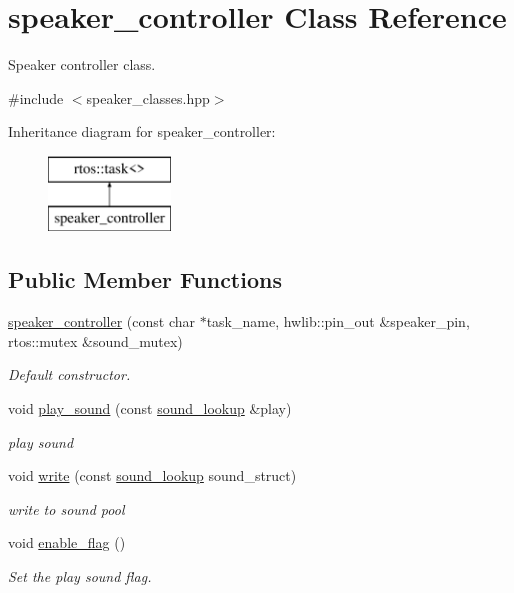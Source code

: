 \hypertarget{classspeaker__controller}{}\section{speaker\+\_\+controller Class Reference}
\label{classspeaker__controller}


Speaker controller class.  




{\ttfamily \#include $<$speaker\+\_\+classes.\+hpp$>$}

Inheritance diagram for speaker\+\_\+controller\+:\begin{figure}[H]
\begin{center}
\leavevmode
\includegraphics[height=2.000000cm]{classspeaker__controller}
\end{center}
\end{figure}
\subsection*{Public Member Functions}
\begin{DoxyCompactItemize}
\item 
\hyperlink{classspeaker__controller_aff5f11eb09fef5a599181d36a6b2a2a9}{speaker\+\_\+controller} (const char $\ast$task\+\_\+name, hwlib\+::pin\+\_\+out \&speaker\+\_\+pin, rtos\+::mutex \&sound\+\_\+mutex)
\begin{DoxyCompactList}\small\item\em Default constructor. \end{DoxyCompactList}\item 
void \hyperlink{classspeaker__controller_a13df562814c54591d83e4dd05e6930ca}{play\+\_\+sound} (const \hyperlink{structsound__lookup}{sound\+\_\+lookup} \&play)
\begin{DoxyCompactList}\small\item\em play sound \end{DoxyCompactList}\item 
void \hyperlink{classspeaker__controller_a7596b187aa529529886992fd6545bcab}{write} (const \hyperlink{structsound__lookup}{sound\+\_\+lookup} sound\+\_\+struct)
\begin{DoxyCompactList}\small\item\em write to sound pool \end{DoxyCompactList}\item 
void \hyperlink{classspeaker__controller_ac960be64207122d099dab24de3928d98}{enable\+\_\+flag} ()
\begin{DoxyCompactList}\small\item\em Set the play sound flag. \end{DoxyCompactList}\end{DoxyCompactItemize}
